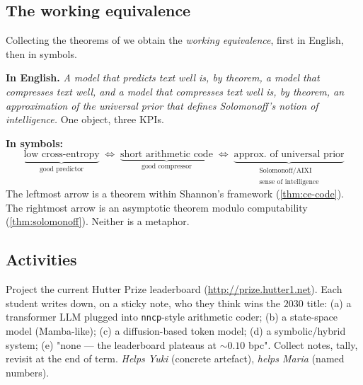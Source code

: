 \documentclass[12pt,a4paper]{article}
\theoremstyle{plain}
\theoremstyle{definition}
\begin{document}
\subsection*{The working equivalence}

Collecting the theorems of  we
obtain the \emph{working equivalence}, first in English, then in
symbols.

\medskip
\noindent\textbf{In English.}  \emph{A model that predicts text
well is, by theorem, a model that compresses text well, and a model
that compresses text well is, by theorem, an approximation of the
universal prior that defines Solomonoff's notion of intelligence.}
One object, three KPIs.

\medskip
\noindent\textbf{In symbols:}
\begin{equation}
  \underbrace{\text{low cross-entropy}}_{\text{good predictor}}
  \;\Longleftrightarrow\;
  \underbrace{\text{short arithmetic code}}_{\text{good compressor}}
  \;\Longleftrightarrow\;
  \underbrace{\text{approx.\ of universal prior}}_{\substack{\text{Solomonoff/AIXI}\\\text{sense of intelligence}}}
  \label{eq:chain}
\end{equation}
The leftmost arrow is a theorem within Shannon's framework
(\cref{thm:ce-code}).  The rightmost arrow is an asymptotic
theorem modulo computability (\cref{thm:solomonoff}).  Neither is
a metaphor.

\subsection*{Activities}

\begin{activity}[title={Activity 1 --- Hutter Prize bingo}]
Project the current Hutter Prize leaderboard
(\url{http://prize.hutter1.net}).  Each student writes down, on a
sticky note, who they think wins the $2030$ title: (a) a
transformer LLM plugged into \texttt{nncp}-style arithmetic coder;
(b) a state-space model (Mamba-like); (c) a diffusion-based token
model; (d) a symbolic/hybrid system; (e) "none --- the leaderboard
plateaus at $\sim 0.10$ bpc".  Collect notes, tally, revisit at the
end of term.  \emph{Helps Yuki} (concrete artefact),
\emph{helps Maria} (named numbers).
\end{activity}
\end{document}
